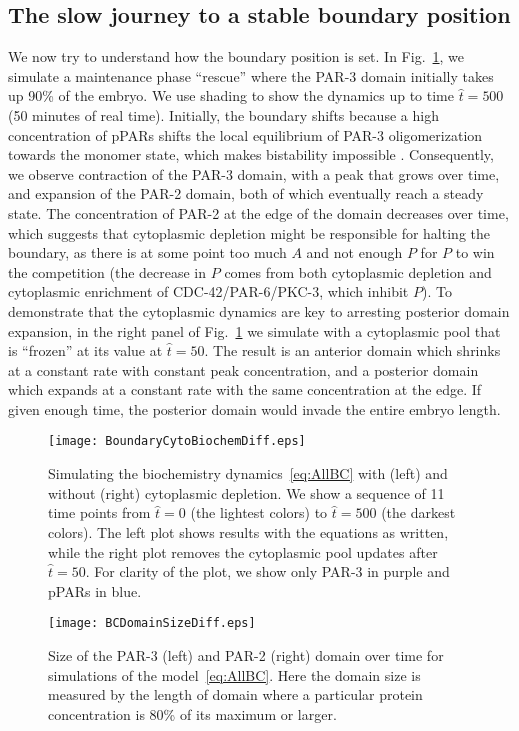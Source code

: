 \documentclass[11pt]{article}
\newcommand{\6}[1]{#1_{\text{6}}}
\newcommand{\3}[1]{#1_{\text{3}}}
\begin{document}
\subsection{The slow journey to a stable boundary position}
We now try to understand how the boundary position is set. In Fig.\ \ref{fig:BoundaryDiff}, we simulate a maintenance phase ``rescue'' where the PAR-3 domain initially takes up 90\% of the embryo. We use shading to show the dynamics up to time $\hat t = 500$ (50 minutes of real time). Initially, the boundary shifts because a high concentration of pPARs shifts the local equilibrium of PAR-3 oligomerization towards the monomer state, which makes bistability impossible \cite{lang2023oligomerization}. Consequently, we observe contraction of the PAR-3 domain, with a peak that grows over time, and expansion of the PAR-2 domain, both of which eventually reach a steady state. The concentration of PAR-2 at the edge of the domain decreases over time, which suggests that cytoplasmic depletion might be responsible for halting the boundary, as there is at some point too much $A$ and not enough $P$ for $P$ to win the competition (the decrease in $P$ comes from both cytoplasmic depletion and cytoplasmic enrichment of CDC-42/PAR-6/PKC-3, which inhibit $P$). To demonstrate that the cytoplasmic dynamics are key to arresting posterior domain expansion, in the right panel of Fig.\ \ref{fig:BoundaryDiff} we simulate with a cytoplasmic pool that is ``frozen'' at its value at $\hat t = 50$. The result is an anterior domain which shrinks at a constant rate with constant peak concentration, and a posterior domain which expands at a constant rate with the same concentration at the edge. If given enough time, the posterior domain would invade the entire embryo length. 



\begin{figure}
\centering
\texttt{[image: BoundaryCytoBiochemDiff.eps]}
\caption{\label{fig:BoundaryDiff}Simulating the biochemistry dynamics\ \eqref{eq:AllBC} with (left) and without (right) cytoplasmic depletion. We show a sequence of 11 time points from $\hat t = 0$ (the lightest colors) to $\hat t = 500$ (the darkest colors). The left plot shows results with the equations as written, while the right plot removes the cytoplasmic pool updates after $\hat t = 50$. For clarity of the plot, we show only PAR-3 in purple and pPARs in blue. }
\end{figure}

\begin{figure}
\centering
\texttt{[image: BCDomainSizeDiff.eps]}
\caption{\label{fig:BCDSD} Size of the PAR-3 (left) and PAR-2 (right) domain over time for simulations of the model\ \eqref{eq:AllBC}. Here the domain size is measured by the length of domain where a particular protein concentration is 80\% of its maximum or larger. }
\end{figure}
\end{document}
